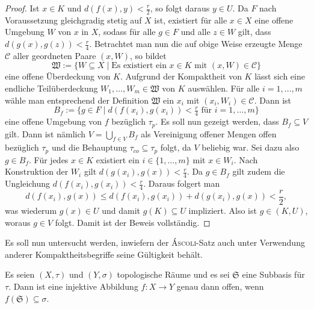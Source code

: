 \begin{proof}
  Ist $x \in K$ und $d(f(x),y) < \tfrac{r}{2}$, so folgt daraus $y \in U$.
  Da $F$ nach Voraussetzung gleichgradig stetig auf $X$ ist, existiert für alle $x \in X$ eine offene Umgebung $W$ von $x$ in $X$, sodass für alle $g \in F$ und alle $z \in W$ gilt, dass $d(g(x),g(z)) < \tfrac{r}{4}$.
  Betrachtet man nun die auf obige Weise erzeugte Menge $\mathcal{C}$ aller geordneten Paare $(x,W)$, so bildet
  \begin{displaymath}
    \mathfrak{W} := \{W \subseteq X \mid \text{Es existiert ein $x \in K$ mit $(x,W) \in \mathcal{C}$} \}
  \end{displaymath}
  eine offene Überdeckung von $K$.
  Aufgrund der Kompaktheit von $K$ lässt sich eine endliche Teilüberdeckung $W_1,\dots,W_m \in \mathfrak{W}$ von $K$ auswählen.
  Für alle $i = 1,\dots,m$ wähle man entsprechend der Definition $\mathfrak{W}$ ein $x_i$ mit $(x_i,W_i) \in \mathcal{C}$.
  Dann ist
  \begin{displaymath}
    B_f := \{ g \in F \mid d(f(x_i),g(x_i)) < \tfrac{r}{4} \text{ für } i = 1,\dots,m\}
  \end{displaymath}
  eine offene Umgebung von $f$ bezüglich $\tau_p$.
  Es soll nun gezeigt werden, dass $B_f \subseteq V$ gilt.
  Dann ist nämlich $V = \bigcup_{f \in V} B_f$ als Vereinigung offener Mengen offen bezüglich $\tau_p$ und die Behauptung $\tau_{co} \subseteq \tau_p$ folgt, da $V$ beliebig war.
  Sei dazu also $g \in B_f$.
  Für jedes $x \in K$ existiert ein $i \in \{1,\dots,m\}$ mit $x \in W_i$.
  Nach Konstruktion der $W_i$ gilt $d(g(x_i),g(x)) < \tfrac{r}{4}$.
  Da $g \in B_f$ gilt zudem die Ungleichung $d(f(x_i),g(x_i)) < \tfrac{r}{4}$.
  Daraus folgert man
  \begin{displaymath}
    d(f(x_i),g(x)) \leq d(f(x_i),g(x_i)) + d(g(x_i),g(x)) < \frac{r}{2},
  \end{displaymath}
  was wiederum $g(x) \in U$ und damit $g(K) \subseteq U$ impliziert. 
  Also ist $g \in (K,U)$, woraus $g \in V$ folgt.
  Damit ist der Beweis vollständig.
\end{proof}

Es soll nun untersucht werden, inwiefern der \textsc{Áscoli}-Satz auch unter Verwendung anderer Kompaktheitsbegriffe seine Gültigkeit behält.

\begin{lem}
  \label{lem:openmap}
  Es seien $(X,\tau)$ und $(Y,\sigma)$ topologische Räume und es sei $\mathfrak{S}$ eine Subbasis für $\tau$.  
  Dann ist eine injektive Abbildung $f \colon X \to Y$ genau dann offen, wenn $f(\mathfrak{S}) \subseteq \sigma$.
\end{lem}

